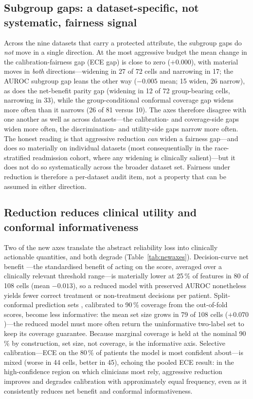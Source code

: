 \documentclass[fleqn,10pt]{wlscirep}
\newcommand{\result}[1]{#1}
\begin{document}
\subsection{Subgroup gaps: a dataset-specific, not systematic, fairness signal}
Across the nine datasets that carry a protected attribute, the subgroup gaps do \emph{not} move in a
single direction. At the most aggressive budget the mean change in the calibration-fairness gap (ECE
gap) is close to zero (\result{$+0.000$}), with material moves in \emph{both} directions---widening in
\result{27} of \result{72} cells and narrowing in \result{17}; the AUROC subgroup gap leans the other
way (\result{$-0.005$} mean; \result{15} widen, \result{26} narrow), as does the net-benefit parity
gap \cite{pfohl2022net} (widening in \result{12} of \result{72} group-bearing cells, narrowing in
\result{33}), while the group-conditional conformal coverage gap widens more often than it narrows
(\result{26} of \result{81} versus \result{10}). The axes therefore disagree with one another as well
as across datasets---the calibration- and coverage-side gaps widen more often, the discrimination- and
utility-side gaps narrow more often. The honest
reading is that aggressive reduction \emph{can} widen a fairness gap---and does so materially on
individual datasets (most consequentially in the race-stratified readmission cohort, where any widening
is clinically salient)---but it does not do so systematically across the broader dataset set. Fairness
under reduction is therefore a per-dataset audit item, not a property that can be assumed in either
direction.

\subsection{Reduction reduces clinical utility and conformal informativeness}
Two of the new axes translate the abstract reliability loss into clinically actionable quantities, and
both degrade (Table~\ref{tab:newaxes}). Decision-curve net benefit \cite{vickers2006decision}---the
standardised benefit of acting on the score, averaged over a clinically relevant threshold range---is
materially lower at 25\,\% of features in \result{80} of \result{108} cells (mean \result{$-0.013$}),
so a reduced model with preserved AUROC nonetheless yields fewer correct
treatment or non-treatment decisions per patient. Split-conformal prediction sets
\cite{romano2020classification,angelopoulos2023conformal}, calibrated to 90\,\% coverage from the
out-of-fold scores, become less informative: the mean set size grows in \result{79} of \result{108}
cells (\result{$+0.070$})---the reduced model must more often return the uninformative two-label set to
keep its coverage guarantee. Because marginal coverage is held at the nominal 90\,\% by construction,
set size, not coverage, is the informative axis. Selective calibration---ECE on the 80\,\% of patients
the model is most confident about---is mixed (worse in \result{44} cells, better in \result{45}),
echoing the pooled ECE result: in the high-confidence region on which clinicians most rely, aggressive
reduction improves and degrades calibration with approximately equal frequency, even as it consistently
reduces net benefit and conformal informativeness.
\end{document}

